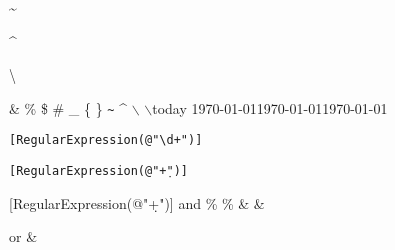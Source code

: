 \documentclass{scrbook}
\begin{document}
\textasciitilde

\textasciicircum

\textbackslash

\& \% \$ \# \_ \{  \} \texttt{\~{}} \^{} $\backslash$ $\backslash$today
\newline
\today \newline \today \newline \today

\verb|[RegularExpression(@"\d+")]|

\texttt{[RegularExpression(@"\string\d+")]}

\textsf{[RegularExpression(@"\string\d+")]} \newline \textlangle and \textrangle \newline \% \% \& \&

\newcommand{\textampersand}[0]{\&} or \renewcommand{\textampersand}[0]{\&}
\textampersand
\end{document}

